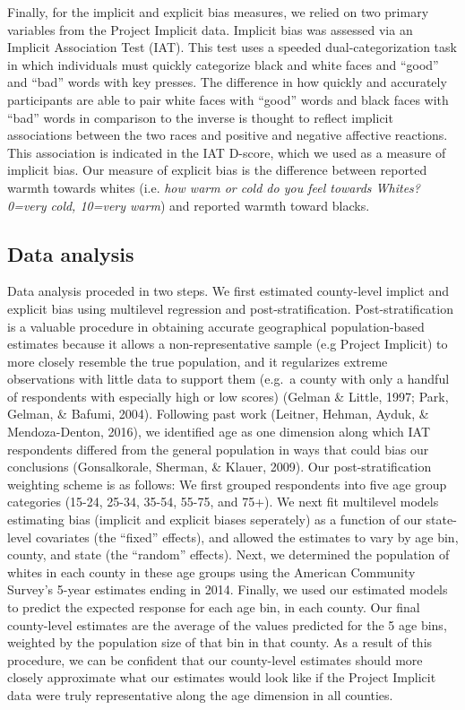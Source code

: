 \documentclass[english,floatsintext,man]{apa6}
\theoremstyle{definition}
\theoremstyle{definition}
\theoremstyle{remark}
\begin{document}
Finally, for the implicit and explicit bias measures, we relied on two
primary variables from the Project Implicit data. Implicit bias was
assessed via an Implicit Association Test (IAT). This test uses a
speeded dual-categorization task in which individuals must quickly
categorize black and white faces and \enquote{good} and \enquote{bad}
words with key presses. The difference in how quickly and accurately
participants are able to pair white faces with \enquote{good} words and
black faces with \enquote{bad} words in comparison to the inverse is
thought to reflect implicit associations between the two races and
positive and negative affective reactions. This association is indicated
in the IAT D-score, which we used as a measure of implicit bias. Our
measure of explicit bias is the difference between reported warmth
towards whites (i.e. \emph{how warm or cold do you feel towards Whites?
0=very cold, 10=very warm}) and reported warmth toward blacks.

\subsection{Data analysis}\label{data-analysis}

Data analysis proceded in two steps. We first estimated county-level
implict and explicit bias using multilevel regression and
post-stratification. Post-stratification is a valuable procedure in
obtaining accurate geographical population-based estimates because it
allows a non-representative sample (e.g Project Implicit) to more
closely resemble the true population, and it regularizes extreme
observations with little data to support them (e.g.~a county with only a
handful of respondents with especially high or low scores) (Gelman \&
Little, 1997; Park, Gelman, \& Bafumi, 2004). Following past work
(Leitner, Hehman, Ayduk, \& Mendoza-Denton, 2016), we identified age as
one dimension along which IAT respondents differed from the general
population in ways that could bias our conclusions (Gonsalkorale,
Sherman, \& Klauer, 2009). Our post-stratification weighting scheme is
as follows: We first grouped respondents into five age group categories
(15-24, 25-34, 35-54, 55-75, and 75+). We next fit multilevel models
estimating bias (implicit and explicit biases seperately) as a function
of our state-level covariates (the \enquote{fixed} effects), and allowed
the estimates to vary by age bin, county, and state (the
\enquote{random} effects). Next, we determined the population of whites
in each county in these age groups using the American Community Survey's
5-year estimates ending in 2014. Finally, we used our estimated models
to predict the expected response for each age bin, in each county. Our
final county-level estimates are the average of the values predicted for
the 5 age bins, weighted by the population size of that bin in that
county. As a result of this procedure, we can be confident that our
county-level estimates should more closely approximate what our
estimates would look like if the Project Implicit data were truly
representative along the age dimension in all counties.
\end{document}
